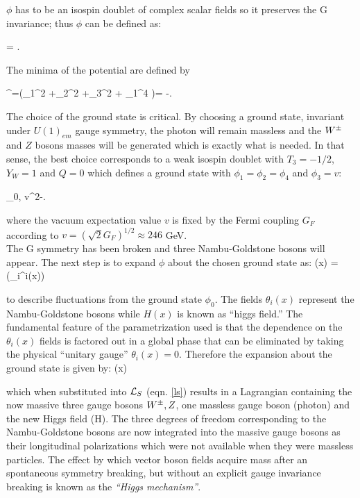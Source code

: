 \noindent $\phi$ has to be an isospin doublet of complex scalar fields so it preserves the G invariance; thus $\phi$ can be defined as:

\beqn
\phi =  \equiv {}.
\eeqn

\noindent The minima of the potential are defined by

\beqn
\phi^\dagger\phi=(\phi_1^2 +\phi_2^2 +\phi_3^2 + \phi_1^4 )= -.
\eeqn

\noindent The choice of the ground state is critical. By choosing a ground state, invariant under $U(1)_{em}$ gauge symmetry, the photon will remain massless and the $W^\pm$ and $Z$ bosons masses will be generated which is exactly what is needed. In that sense, the best choice corresponds to a weak isospin doublet with $T_3=-1/2$, $Y_W=1$ and $Q=0$ which defines a ground state with $\phi_1=\phi_2=\phi_4$ and $\phi_3=v$:

\beqn\label{field_exp}
\phi_0\equiv{}, \qquad v^2\equiv-.
\eeqn

\noindent where the vacuum expectation value $v$ is fixed by the Fermi coupling $G_F$ according to $v=(\sqrt{2}G_F)^{1/2}\approx 246$ GeV.\\

\noindent The G symmetry has been broken and three Nambu-Goldstone bosons will appear. The next step is to expand $\phi$ about the chosen ground state as:
\beqn
\phi(x) = \exp\left(\sigma_i\theta^i(x)\right) \approx {} 
\eeqn

\noindent to describe fluctuations from the ground state $\phi_0$. The fields $\theta_i(x)$ represent the Nambu-Goldstone bosons while $H(x)$ is known as ``higgs field.'' The fundamental feature of the parametrization used is that the dependence on the $\theta_i(x)$ fields is factored out in a global phase that can be eliminated by taking the physical ``unitary gauge'' $\theta_i(x)=0$. Therefore the expansion about the ground state is given by:
\beqn\label{higgs_dublet}
\phi(x)
\eeqn

\noindent which when substituted into $\mathcal{L}_S$ (eqn. \ref{ls}) results in a Lagrangian containing the now massive three gauge bosons $W^\pm, Z$, one massless gauge boson (photon) and the new Higgs field (H). The three degrees of freedom corresponding to the Nambu-Goldstone bosons are now integrated into the massive gauge bosons as their longitudinal polarizations which were not available when they were massless particles. The effect by which vector boson fields acquire mass after an spontaneous symmetry breaking, but without an explicit gauge invariance breaking is known as the \textit{``Higgs mechanism''}.\\

